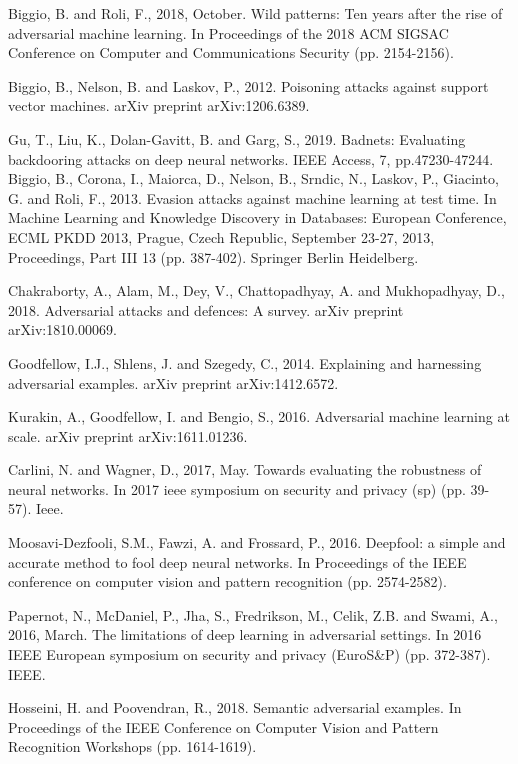 \begin{singlespace}
\begin{thebibliography}{}
  Biggio, B. and Roli, F., 2018, October. Wild patterns: Ten years after the rise of adversarial machine learning. In Proceedings of the 2018 ACM SIGSAC Conference on Computer and Communications Security (pp. 2154-2156).

 Biggio, B., Nelson, B. and Laskov, P., 2012. Poisoning attacks against support vector machines. arXiv preprint arXiv:1206.6389.


 Gu, T., Liu, K., Dolan-Gavitt, B. and Garg, S., 2019. Badnets: Evaluating backdooring attacks on deep neural networks. IEEE Access, 7, pp.47230-47244.
 Biggio, B., Corona, I., Maiorca, D., Nelson, B., Srndic, N., Laskov, P., Giacinto, G. and Roli, F., 2013. Evasion attacks against machine learning at test time. In Machine Learning and Knowledge Discovery in Databases: European Conference, ECML PKDD 2013, Prague, Czech Republic, September 23-27, 2013, Proceedings, Part III 13 (pp. 387-402). Springer Berlin Heidelberg.

 Chakraborty, A., Alam, M., Dey, V., Chattopadhyay, A. and Mukhopadhyay, D., 2018. Adversarial attacks and defences: A survey. arXiv preprint arXiv:1810.00069.

 Goodfellow, I.J., Shlens, J. and Szegedy, C., 2014. Explaining and harnessing adversarial examples. arXiv preprint arXiv:1412.6572.  


 Kurakin, A., Goodfellow, I. and Bengio, S., 2016. Adversarial machine learning at scale. arXiv preprint arXiv:1611.01236.

 Carlini, N. and Wagner, D., 2017, May. Towards evaluating the robustness of neural networks. In 2017 ieee symposium on security and privacy (sp) (pp. 39-57). Ieee.

 Moosavi-Dezfooli, S.M., Fawzi, A. and Frossard, P., 2016. Deepfool: a simple and accurate method to fool deep neural networks. In Proceedings of the IEEE conference on computer vision and pattern recognition (pp. 2574-2582).

 Papernot, N., McDaniel, P., Jha, S., Fredrikson, M., Celik, Z.B. and Swami, A., 2016, March. The limitations of deep learning in adversarial settings. In 2016 IEEE European symposium on security and privacy (EuroS\&P) (pp. 372-387). IEEE.

Hosseini, H. and Poovendran, R., 2018. Semantic adversarial examples. In Proceedings of the IEEE Conference on Computer Vision and Pattern Recognition Workshops (pp. 1614-1619).


\end{thebibliography}
\end{singlespace}
